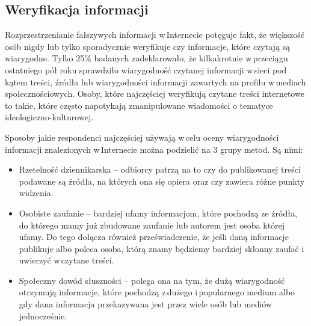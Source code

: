 \subsection{Weryfikacja informacji} \label{badanie-wiarygodnosci-w-internecie}
Rozprzestrzenianie  fałszywych informacji w\,Internecie potęguje fakt, że większość osób nigdy lub tylko sporadycznie weryfikuje czy informacje, które czytają są wiarygodne. Tylko 25\% badanych zadeklarowało, że kilkakrotnie w\,przeciągu ostatniego pół roku sprawdziło wiarygodność czytanej informacji w\,sieci pod kątem treści, źródła lub wiarygodności informacji zawartych na profilu w\,mediach społecznościowych\cite{NASKBezpieczneWybory2019}. Osoby, które najczęściej weryfikują czytane treści internetowe to takie, które często napotykają zmanipulowane wiadomości o tematyce ideologiczno-kulturowej.
\par
Sposoby jakie respondenci najczęściej używają w\,celu oceny wiarygodności informacji znalezionych w\,Internecie można podzielić na 3 grupy metod. Są nimi:
\begin{itemize}
    \item Rzetelność dziennikarska – odbiorcy patrzą na to czy do publikowanej treści podawane są źródła, na których ona się opiera oraz czy zawiera różne punkty widzenia. 
    \item Osobiste zaufanie – bardziej ufamy informacjom, które pochodzą ze źródła, do którego mamy już zbudowane zaufanie lub autorem jest osoba której ufamy. Do tego dołącza również przeświadczenie, że jeśli daną informacje publikuje albo poleca osoba, którą znamy będziemy bardziej skłonny zaufać i\,uwierzyć w\,czytane treści.
    \item Społeczny dowód słuszności – polega ona na tym, że dużą wiarygodność otrzymują informacje, które pochodzą z\,dużego i\,popularnego medium albo gdy dana informacja przekazywana jest przez wiele osób lub mediów jednocześnie.   
\end{itemize}

